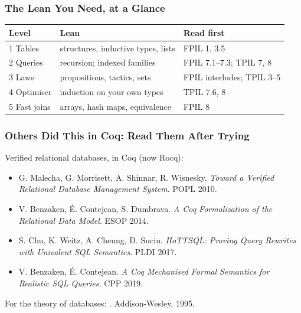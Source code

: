 \begin{frame}
  \frametitle{The Lean You Need, at a Glance}
  {\centering\renewcommand{}
    {\headerrow\begin{tabular}{@{}l@{\qquad}>{\raggedright\arraybackslash}p{62mm}@{\qquad}>{\raggedright\arraybackslash}p{46mm}@{}}
      \hline
      \textbf{Level} & \textbf{Lean} & \textbf{Read first} \\ \hline
      1 Tables & structures, inductive types, lists & FPIL 1, 3.5 \\
      2 Queries & recursion; indexed families & FPIL 7.1--7.3; TPIL 7, 8 \\
      3 Laws & propositions, tactics, sets & FPIL interludes; TPIL 3--5 \\
      4 Optimiser & induction on your own types & TPIL 7.6, 8 \\
      5 Fast joins & arrays, hash maps, equivalence & FPIL 8 \\ \hline
    \end{tabular}}\par}
\end{frame}

\begin{frame}
  \frametitle{Others Did This in Coq: Read Them After Trying}
  Verified relational databases, in Coq (now Rocq):
  \begin{itemize}
    \item G. Malecha, G. Morrisett, A. Shinnar, R. Wisnesky. \emph{Toward a
      Verified Relational Database Management System}. POPL 2010.
    \item V. Benzaken, \'E. Contejean, S. Dumbrava. \emph{A Coq
      Formalization of the Relational Data Model}. ESOP 2014.
    \item S. Chu, K. Weitz, A. Cheung, D. Suciu. \emph{HoTTSQL: Proving
      Query Rewrites with Univalent SQL Semantics}. PLDI 2017.
    \item V. Benzaken, \'E. Contejean. \emph{A Coq Mechanised Formal
      Semantics for Realistic SQL Queries}. CPP 2019.
  \end{itemize}
  For the theory of databases: . Addison-Wesley, 1995.
\end{frame}
